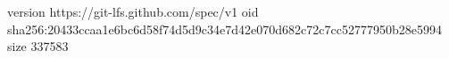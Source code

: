 version https://git-lfs.github.com/spec/v1
oid sha256:20433ccaa1e6bc6d58f74d5d9c34e7d42e070d682c72c7cc52777950b28e5994
size 337583
